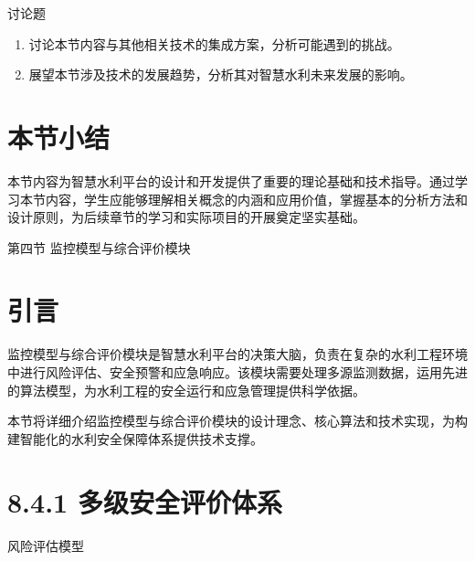 讨论题

\begin{enumerate}
\def\labelenumi{\arabic{enumi}.}
\setcounter{enumi}{6}
\tightlist
\item
  讨论本节内容与其他相关技术的集成方案，分析可能遇到的挑战。
\item
  展望本节涉及技术的发展趋势，分析其对智慧水利未来发展的影响。
\end{enumerate}

\section{本节小结}

本节内容为智慧水利平台的设计和开发提供了重要的理论基础和技术指导。通过学习本节内容，学生应能够理解相关概念的内涵和应用价值，掌握基本的分析方法和设计原则，为后续章节的学习和实际项目的开展奠定坚实基础。

 第四节 监控模型与综合评价模块

\section{引言}

监控模型与综合评价模块是智慧水利平台的决策大脑，负责在复杂的水利工程环境中进行风险评估、安全预警和应急响应。该模块需要处理多源监测数据，运用先进的算法模型，为水利工程的安全运行和应急管理提供科学依据。

本节将详细介绍监控模型与综合评价模块的设计理念、核心算法和技术实现，为构建智能化的水利安全保障体系提供技术支撑。

\section{8.4.1 多级安全评价体系}

 风险评估模型

